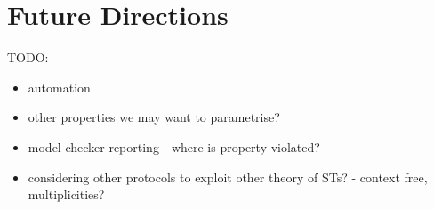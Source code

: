\documentclass{article}
\newcommand{\todo}[1]{}
\renewcommand{\todo}[1]{{\color{red} TODO: {#1}}}
\begin{document}
\section{Future Directions}

\todo{
    \begin{itemize}
        \item automation
        \item other properties we may want to parametrise?
        \item model checker reporting - where is property violated?
        \item considering other protocols to exploit other theory of STs? - context free, multiplicities?
    \end{itemize}
}

\medskip
\nocite{*}
\printbibliography
\end{document}
